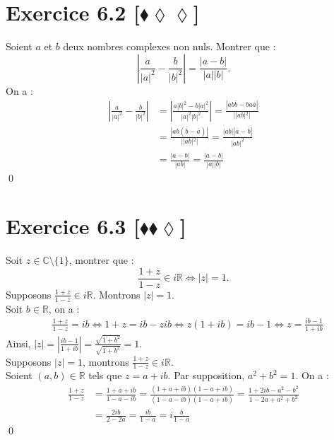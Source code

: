 \documentclass[10pt]{article}
\begin{document}

\section*{Exercice 6.2 [$\blacklozenge\lozenge\lozenge$]}
\begin{tcolorbox}[enhanced, width=7in, center, size=fbox, fontupper=\large, drop shadow southwest]
    Soient $a$ et $b$ deux nombres complexes non nuls. Montrer que :
    \begin{equation*}
        \left|\frac{a}{|a|^2}-\frac{b}{|b|^2}\right|=\frac{|a-b|}{|a||b|}.
    \end{equation*}
    On a : 
    \begin{align*}
        \left|\frac{a}{|a|^2}-\frac{b}{|b|^2}\right| &= \left|\frac{a|b|^2-b|a|^2}{|a|^2|b|^2}\right| = \frac{|ab\overline{b}-ba\overline{a}|}{||ab|^2|}\\
        &=\frac{\left|ab(\overline{b}-\overline{a})\right|}{||ab|^2|} =\frac{|ab||\overline{a}-\overline{b}|}{|ab|^2}\\
        &=\frac{|a-b|}{|ab|} = \frac{|a-b|}{|a||b|}
    \end{align*}
    \qed
\end{tcolorbox}


\section*{Exercice 6.3 [$\blacklozenge\blacklozenge\lozenge$]}
\begin{tcolorbox}[enhanced, width=7in, center, size=fbox, fontupper=\large, drop shadow southwest]
    Soit $z \in \mathbb{C} \setminus \{1\}$, montrer que :
    \begin{equation*}
        \frac{1+z}{1-z} \in i\mathbb{R} \iff |z| = 1.
    \end{equation*}
    Supposons $\frac{1+z}{1-z} \in i\mathbb{R}$. Montrons $|z|=1$.\\
    Soit $b\in\mathbb{R}$, on a :
    \begin{align*}
        &\frac{1+z}{1-z}=ib\iff1+z=ib-zib\iff z(1+ib)=ib-1\iff z=\frac{ib-1}{1+ib}
    \end{align*}
    Ainsi, $|z|=|\frac{ib-1}{1+ib}|=\frac{\sqrt{1+b^2}}{\sqrt{1+b^2}}=1$.\\
    Supposons $|z|=1$, montrons $\frac{1+z}{1-z} \in i\mathbb{R}$.\\
    Soient $(a,b)\in\mathbb{R}$ tels que $z=a+ib$. Par supposition, $a^2+b^2=1$. On a :
    \begin{align*}
        \frac{1+z}{1-z}&=\frac{1+a+ib}{1-a-ib}=\frac{(1+a+ib)(1-a+ib)}{(1-a-ib)(1-a+ib)}=\frac{1+2ib-a^2-b^2}{1-2a+a^2+b^2}\\
        &= \frac{2ib}{2-2a} = \frac{ib}{1-a}=i\frac{b}{1-a}
    \end{align*}
    \qed
\end{tcolorbox}
\end{document}

